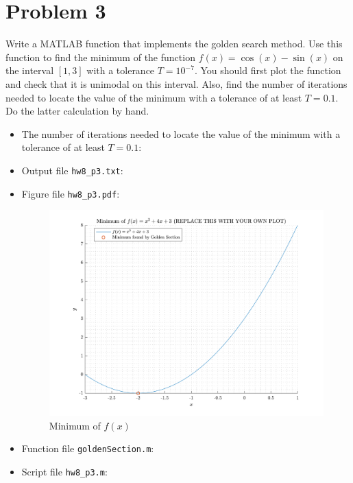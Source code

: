 \section{Problem 3}%
\label{sec:problem_3}
Write a MATLAB function that implements the golden search method. Use this function to find the minimum of the function $f(x) = \cos(x) - \sin(x)$ on the interval $[1, 3]$ with a tolerance $T = 10^{-7}$. You should  first plot the function and check that it is unimodal on this interval. Also, find the number of iterations needed to locate the value of the minimum with a tolerance of at least $T = 0.1$. Do the latter calculation by hand.
\begin{solution}
  \quad
  \begin{itemize}
  \item The number of iterations needed to locate the value of the minimum with a tolerance of at least $T = 0.1$:
      \quad \vfill                               %
  \item Output file \verb|hw8_p3.txt|:
    
  \item Figure file \verb|hw8_p3.pdf|:
    \begin{figure}[!hbtp]
      \centering
      \includegraphics[width=0.8\linewidth]{../src/hw8_p3.pdf}
      \caption{Minimum of $f(x)$ }%
      \label{fig:hw8_p3}
    \end{figure}
  \item Function file \verb|goldenSection.m|:
    
  \item Script file \verb|hw8_p3.m|:
    
  \end{itemize}
\end{solution}

